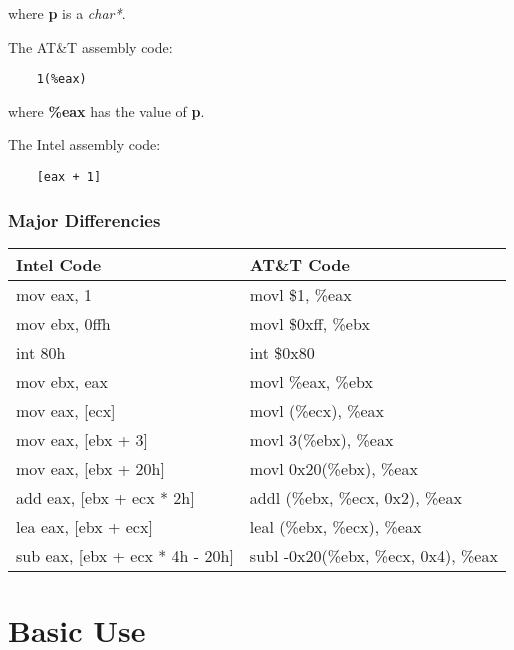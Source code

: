 {\begin{frame}[containsverbatim]
  where \textbf{p} is a \textit{char*}.

  \nl

  The AT\&T assembly code:

  \begin{verbatim}
    1(%eax)
  \end{verbatim}

  where \textbf{\%eax} has the value of \textbf{p}.

  \nl

  The Intel assembly code:

  \begin{verbatim}
    [eax + 1]
  \end{verbatim}
\end{frame}


\begin{frame}
  \frametitle{Major Differencies}

  \begin{center}

  \begin{tabular}{|p{4.9cm}|p{4.9cm}|}
    \hline
    \textbf{Intel Code} & \textbf{AT\&T Code} \\
    \hline
    mov eax, 1 & movl \$1, \%eax \\
    \hline
    mov ebx, 0ffh & movl \$0xff, \%ebx \\
    \hline
    int 80h & int \$0x80 \\
    \hline
    mov ebx, eax & movl \%eax, \%ebx \\
    \hline
    mov eax, [ecx] & movl (\%ecx), \%eax \\
    \hline
    mov eax, [ebx + 3] & movl 3(\%ebx), \%eax \\
    \hline
    mov eax, [ebx + 20h] & movl 0x20(\%ebx), \%eax \\
    \hline
    add eax, [ebx + ecx * 2h] & addl (\%ebx, \%ecx, 0x2), \%eax \\
    \hline
    lea eax, [ebx + ecx] & leal (\%ebx, \%ecx), \%eax \\
    \hline
    sub eax, [ebx + ecx * 4h - 20h] & subl -0x20(\%ebx, \%ecx, 0x4), \%eax \\
    \hline
  \end{tabular}

  \end{center}
\end{frame}

%
%

\section{Basic Use}

}
